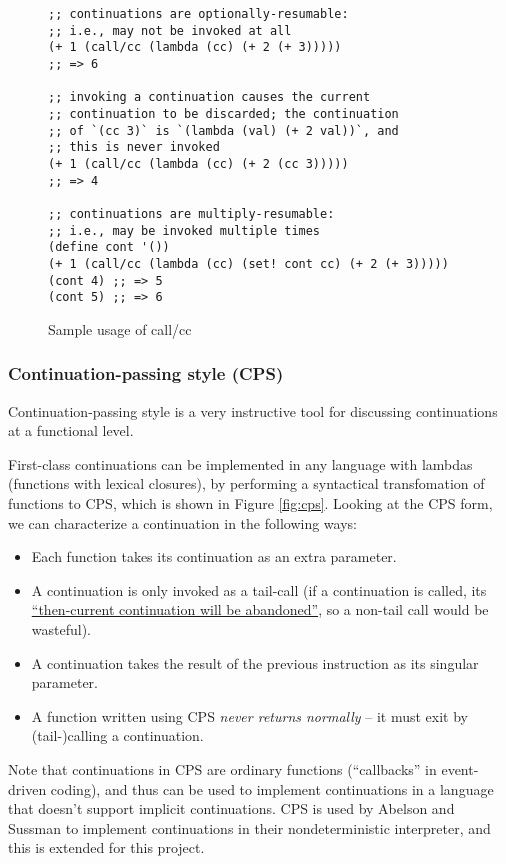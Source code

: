 \documentclass[]{article}
\begin{document}
\begin{figure}
  \centering
\begin{verbatim}
;; continuations are optionally-resumable:
;; i.e., may not be invoked at all
(+ 1 (call/cc (lambda (cc) (+ 2 (+ 3)))))
;; => 6

;; invoking a continuation causes the current
;; continuation to be discarded; the continuation
;; of `(cc 3)` is `(lambda (val) (+ 2 val))`, and
;; this is never invoked
(+ 1 (call/cc (lambda (cc) (+ 2 (cc 3)))))
;; => 4

;; continuations are multiply-resumable:
;; i.e., may be invoked multiple times
(define cont '())
(+ 1 (call/cc (lambda (cc) (set! cont cc) (+ 2 (+ 3)))))
(cont 4) ;; => 5
(cont 5) ;; => 6
\end{verbatim}
  \caption{Sample usage of call/cc}
  \label{fig:ccce}
\end{figure}

\subsubsection{Continuation-passing style (CPS)}
\label{sec:cps}

Continuation-passing style is a very instructive tool for discussing continuations at a functional level.

First-class continuations can be implemented in any language with lambdas (functions with lexical closures), by performing a syntactical transfomation of functions to CPS, which is shown in Figure \ref{fig:cps}. Looking at the CPS form, we can characterize a continuation in the following ways:
\begin{itemize}
\item Each function takes its continuation as an extra parameter.
\item A continuation is only invoked as a tail-call (if a continuation is called, its \href{https://wiki.c2.com/?CallWithCurrentContinuation}{``then-current continuation will be abandoned''}, so a non-tail call would be wasteful).
\item A continuation takes the result of the previous instruction as its singular parameter.
\item A function written using CPS \textit{never returns normally} -- it must exit by (tail-)calling a continuation.
\end{itemize}

Note that continuations in CPS are ordinary functions (``callbacks'' in event-driven coding), and thus can be used to implement continuations in a language that doesn't support implicit continuations. CPS is used by Abelson and Sussman to implement continuations in their nondeterministic interpreter, and this is extended for this project.
\end{document}
